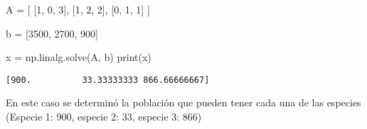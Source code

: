\documentclass[
  letterpaper,
  DIV=11,
  numbers=noendperiod]{scrartcl}
\newenvironment{Shaded}{\begin{snugshade}}{\end{snugshade}}
\newcommand{\BuiltInTok}[1]{\textcolor[rgb]{0.00,0.23,0.31}{#1}}
\newcommand{\DecValTok}[1]{\textcolor[rgb]{0.68,0.00,0.00}{#1}}
\newcommand{\NormalTok}[1]{\textcolor[rgb]{0.00,0.23,0.31}{#1}}
\newcommand{\OperatorTok}[1]{\textcolor[rgb]{0.37,0.37,0.37}{#1}}
\begin{document}
\begin{Shaded}
\begin{Highlighting}[]

\NormalTok{A }\OperatorTok{=}\NormalTok{ [}
\NormalTok{    [}\DecValTok{1}\NormalTok{, }\DecValTok{0}\NormalTok{, }\DecValTok{3}\NormalTok{],}
\NormalTok{    [}\DecValTok{1}\NormalTok{, }\DecValTok{2}\NormalTok{, }\DecValTok{2}\NormalTok{],}
\NormalTok{    [}\DecValTok{0}\NormalTok{, }\DecValTok{1}\NormalTok{, }\DecValTok{1}\NormalTok{]}
\NormalTok{]}

\NormalTok{b }\OperatorTok{=}\NormalTok{ [}\DecValTok{3500}\NormalTok{, }\DecValTok{2700}\NormalTok{, }\DecValTok{900}\NormalTok{]}

\NormalTok{x }\OperatorTok{=}\NormalTok{ np.linalg.solve(A, b)}
\BuiltInTok{print}\NormalTok{(x)}
\end{Highlighting}
\end{Shaded}

\begin{verbatim}
[900.          33.33333333 866.66666667]
\end{verbatim}

En este caso se determinó la población que pueden tener cada una de las
especies (Especie 1: 900, especie 2: 33, especie 3: 866)
\end{document}
